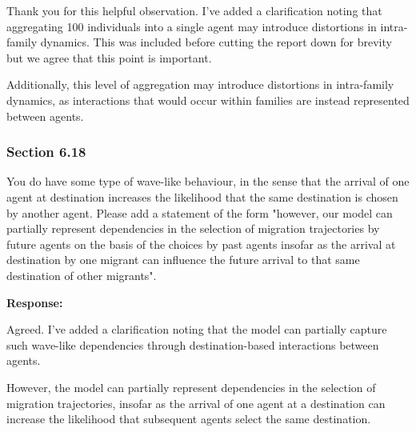 \documentclass[11pt,a4paper]{article}
\begin{document}
Thank you for this helpful observation. I've added a clarification noting that aggregating 100 individuals into a single agent may introduce distortions in intra-family dynamics.
This was included before cutting the report down for brevity but we agree that this point is important.
\vspace{0.5cm}

\begin{updatebox}

Additionally, this level of aggregation may introduce distortions in intra-family dynamics, as interactions that would occur within families are instead represented between agents.

\end{updatebox}

\vspace{0.5cm}

\subsubsection*{Section 6.18}

\begin{reviewbox}
You do have some type of wave-like behaviour, in the sense that the arrival of one agent at destination increases the likelihood that the same destination is chosen by another agent. Please add a statement of the form "however, our model can partially represent dependencies in the selection of migration trajectories by future agents on the basis of the choices by past agents insofar as the arrival at destination by one migrant can influence the future arrival to that same destination of other migrants".
\end{reviewbox}

\textbf{Response:}

Agreed. I've added a clarification noting that the model can partially capture such wave-like dependencies through destination-based interactions between agents.

\vspace{0.5cm}

\begin{updatebox}

However, the model can partially represent dependencies in the selection of migration trajectories, insofar as the arrival of one agent at a destination can increase the likelihood that subsequent agents select the same destination.

\end{updatebox}
\end{document}
